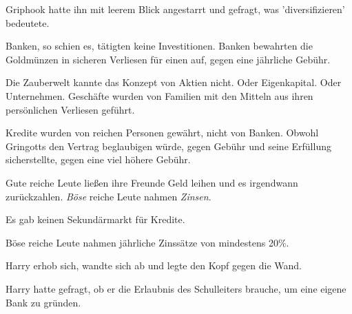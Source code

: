 Griphook hatte ihn mit leerem Blick angestarrt und gefragt, was 'diversifizieren' bedeutete.

Banken, so schien es, tätigten keine Investitionen. Banken bewahrten die Goldmünzen in sicheren Verliesen für einen auf, gegen eine jährliche Gebühr.

Die Zauberwelt kannte das Konzept von Aktien nicht. Oder Eigenkapital. Oder Unternehmen. Geschäfte wurden von Familien mit den Mitteln aus ihren persönlichen Verliesen geführt.

Kredite wurden von reichen Personen gewährt, nicht von Banken. Obwohl Gringotts den Vertrag beglaubigen würde, gegen Gebühr und seine Erfüllung sicherstellte, gegen eine viel höhere Gebühr.

Gute reiche Leute ließen ihre Freunde Geld leihen und es irgendwann zurückzahlen. \emph{Böse} reiche Leute nahmen \emph{Zinsen}.

Es gab keinen Sekundärmarkt für Kredite.

Böse reiche Leute nahmen jährliche Zinssätze von mindestens 20\%.

Harry erhob sich, wandte sich ab und legte den Kopf gegen die Wand.

Harry hatte gefragt, ob er die Erlaubnis des Schulleiters brauche, um eine eigene Bank zu gründen.

